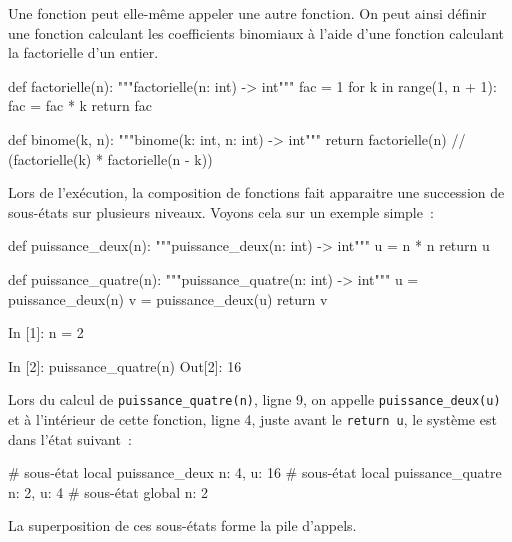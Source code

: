 \documentclass{magnoliaold}
\begin{document}
Une fonction peut elle-même appeler une autre fonction. On peut ainsi définir une fonction
calculant les coefficients binomiaux à l'aide d'une fonction calculant la factorielle
d'un entier.

\begin{pythoncodeline}
def factorielle(n):
    """factorielle(n: int) -> int"""
    fac = 1
    for k in range(1, n + 1):
        fac = fac * k
    return fac

def binome(k, n):
    """binome(k: int, n: int) -> int"""
    return factorielle(n) // (factorielle(k) * factorielle(n - k))
\end{pythoncodeline}

\noindent
Lors de l'exécution, la composition de fonctions fait apparaitre une succession de
sous-états sur plusieurs niveaux. Voyons cela sur un exemple simple~:

\begin{pythoncodeline}
def puissance_deux(n):
    """puissance_deux(n: int) -> int"""
    u = n * n
    return u

def puissance_quatre(n):
    """puissance_quatre(n: int) -> int"""
    u = puissance_deux(n)
    v = puissance_deux(u)
    return v
\end{pythoncodeline}


\begin{pythoncode}
In [1]: n = 2

In [2]: puissance_quatre(n)
Out[2]: 16
\end{pythoncode}

\noindent Lors du calcul de \verb+puissance_quatre(n)+, ligne 9, on appelle \verb!puissance_deux(u)! et
à l'intérieur de cette fonction, ligne 4, juste avant le \verb_return u_, le système est dans l'état suivant~:

\begin{pythoncode}
# sous-état local puissance_deux    {n: 4, u: 16}
# sous-état local puissance_quatre  {n: 2, u: 4}
# sous-état global                  {n: 2}
\end{pythoncode}
\noindent
La superposition de ces sous-états forme la pile d'appels.




\end{document}
